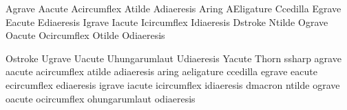 

\startencoding[uc]

 Agrave        {}
 Aacute        {}
 Acircumflex   {}
 Atilde        {}
 Adiaeresis    {}
 Aring         {}
 AEligature    {}
 Ccedilla      {}
 Egrave        {}
 Eacute        {}
 Ediaeresis    {}
 Igrave        {}
 Iacute        {}
 Icircumflex   {}
 Idiaeresis    {}
 Dstroke       {}
 Ntilde        {}
 Ograve        {}
 Oacute        {}
 Ocircumflex   {}
 Otilde        {}
 Odiaeresis    {}

 Ostroke       {}
 Ugrave        {}
 Uacute        {}
 Uhungarumlaut {}
 Udiaeresis    {}
 Yacute        {}
 Thorn         {}
 ssharp        {}
 agrave        {}
 aacute        {}
 acircumflex   {}
 atilde        {}
 adiaeresis    {}
 aring         {}
 aeligature    {}
 ccedilla      {}
 egrave        {}
 eacute        {}
 ecircumflex   {}
 ediaeresis    {}
 igrave        {}
 iacute        {}
 icircumflex   {}
 idiaeresis    {}
 dmacron       {}
 ntilde        {}
 ograve        {}
 oacute        {}
 ocircumflex   {}
 ohungarumlaut {}
 odiaeresis    {}

